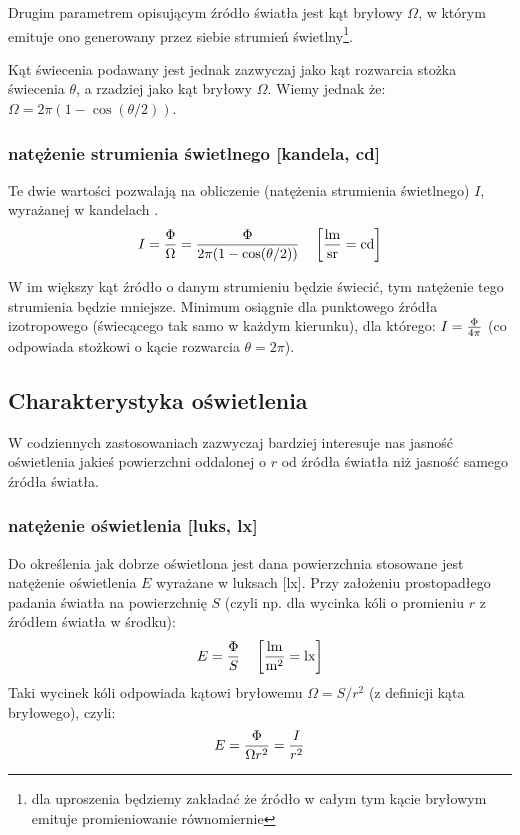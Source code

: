 Drugim parametrem opisującym źródło światła jest kąt bryłowy $\Omega$, w którym emituje ono generowany przez siebie strumień świetlny\footnote{dla uproszenia będziemy zakładać że źródło w całym tym kącie bryłowym emituje promieniowanie równomiernie}.

Kąt świecenia podawany jest jednak zazwyczaj jako kąt rozwarcia stożka świecenia $\theta$, a rzadziej jako kąt bryłowy $\Omega$.
Wiemy jednak że: $\Omega = 2 \pi (1 - \cos (\theta/2))$.

\subsubsection{natężenie strumienia świetlnego [kandela, cd]}

Te dwie wartości pozwalają na obliczenie  (natężenia strumienia świetlnego) $I$, wyrażanej w kandelach \strong{[cd]}.
$$I = {\Phi \over \Omega} = {\Phi \over 2 \pi (1 - \cos (\theta/2))} \quad \left[{\rm {lm \over sr} = cd}\right]$$

W im większy kąt źródło o danym strumieniu będzie świecić, tym natężenie tego strumienia będzie mniejsze.
Minimum osiągnie dla punktowego źródła izotropowego (świecącego tak samo w każdym kierunku), dla którego:
	$I = {\Phi \over 4 \pi}$ (co odpowiada stożkowi o kącie rozwarcia $\theta = 2 \pi$).


\subsection{Charakterystyka oświetlenia}

W codziennych zastosowaniach zazwyczaj bardziej interesuje nas jasność oświetlenia jakieś powierzchni oddalonej o $r$ od źródła światła niż jasność samego źródła światła.

\subsubsection{natężenie oświetlenia [luks, lx]}

Do określenia jak dobrze oświetlona jest dana powierzchnia stosowane jest natężenie oświetlenia $E$ wyrażane w luksach [lx].
Przy założeniu prostopadłego padania światła na powierzchnię $S$ (czyli np. dla wycinka kóli o promieniu $r$ z źródłem światła w środku):
	$$E = {\Phi \over S} \quad \left[{\rm {lm \over m^2} = lx}\right]$$
Taki wycinek kóli odpowiada kątowi bryłowemu $\Omega = S/r^2$ (z definicji kąta bryłowego), czyli:
	$$E = {\Phi \over \Omega r^2} = {I \over r^2}$$


